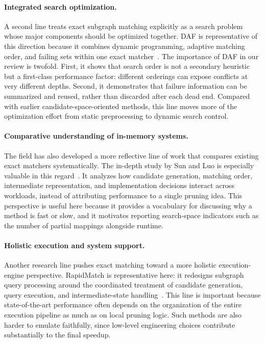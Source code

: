 \paragraph{Integrated search optimization.}
A second line treats exact subgraph matching explicitly as a search problem whose major components should be optimized together. DAF is representative of this direction because it combines dynamic programming, adaptive matching order, and failing sets within one exact matcher~\cite{han2019daf}. The importance of DAF in our review is twofold. First, it shows that search order is not a secondary heuristic but a first-class performance factor: different orderings can expose conflicts at very different depths. Second, it demonstrates that failure information can be summarized and reused, rather than discarded after each dead end. Compared with earlier candidate-space-oriented methods, this line moves more of the optimization effort from static preprocessing to dynamic search control.

\paragraph{Comparative understanding of in-memory systems.}
The field has also developed a more reflective line of work that compares existing exact matchers systematically. The in-depth study by Sun and Luo is especially valuable in this regard~\cite{sun2020study}. It analyzes how candidate generation, matching order, intermediate representation, and implementation decisions interact across workloads, instead of attributing performance to a single pruning idea. This perspective is useful here because it provides a vocabulary for discussing why a method is fast or slow, and it motivates reporting search-space indicators such as the number of partial mappings alongside runtime.

\paragraph{Holistic execution and system support.}
Another research line pushes exact matching toward a more holistic execution-engine perspective. RapidMatch is representative here: it redesigns subgraph query processing around the coordinated treatment of candidate generation, query execution, and intermediate-state handling~\cite{sun2021rapidmatch}. This line is important because state-of-the-art performance often depends on the organization of the entire execution pipeline as much as on local pruning logic. Such methods are also harder to emulate faithfully, since low-level engineering choices contribute substantially to the final speedup.

